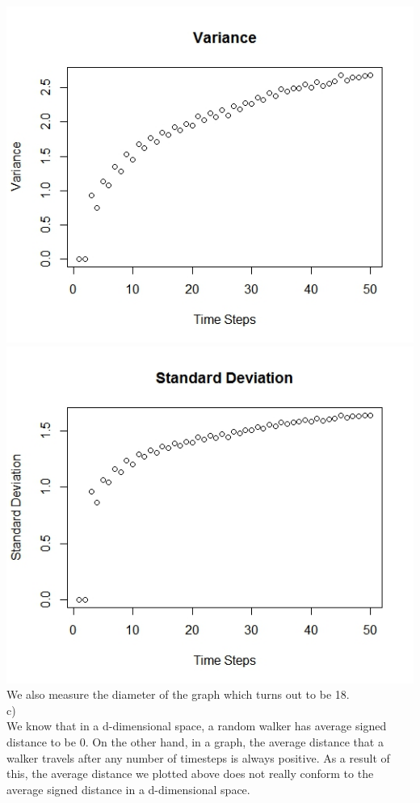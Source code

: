 \documentclass{article}
\begin{document}
\includegraphics[scale=0.4]{p2b} \\
\includegraphics[scale=0.4]{p2c} \\
We also measure the diameter of the graph which turns out to be 18.\\
c)\\
We know that in a d-dimensional space, a random walker has average signed distance to be 0.
On the other hand, in a graph, the average distance that a walker travels after any number of timesteps is 
always positive. As a result of this, the average distance we plotted above does not really conform to the
average signed distance in a d-dimensional space.\\
\end{document}
